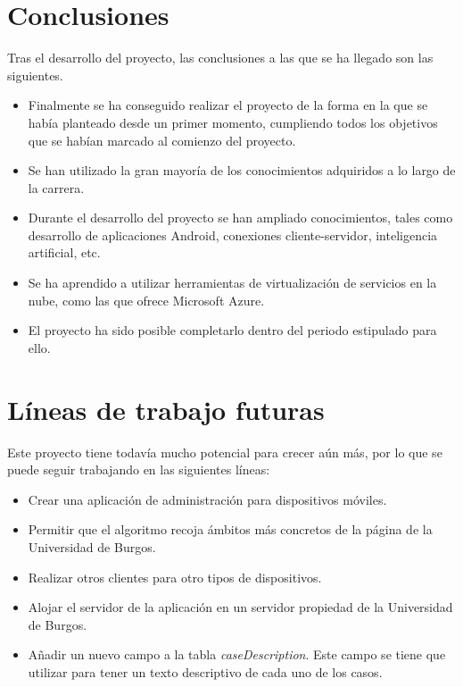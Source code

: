 
\section{Conclusiones}

Tras el desarrollo del proyecto, las conclusiones a las que se ha llegado son las siguientes.

\begin{itemize}
	\tightlist
	\item
	Finalmente se ha conseguido realizar el proyecto de la forma en la que se había planteado desde un primer momento, cumpliendo todos los objetivos que se habían marcado al comienzo del proyecto.	
	\item 
	Se han utilizado la gran mayoría de los conocimientos adquiridos a lo largo de la carrera.
	\item 
	Durante el desarrollo del proyecto se han ampliado conocimientos, tales como desarrollo de aplicaciones Android, conexiones cliente-servidor, inteligencia artificial, etc.
	\item 
	Se ha aprendido a utilizar herramientas de virtualización de servicios en la nube, como las que ofrece Microsoft Azure.
	\item 
	El proyecto ha sido posible completarlo dentro del periodo estipulado para ello.
\end{itemize}

\section{Líneas de trabajo futuras}

Este proyecto tiene todavía mucho potencial para crecer aún más, por lo que se puede seguir trabajando en las siguientes líneas:

\begin{itemize}
	\tightlist
	\item
	Crear una aplicación de administración para dispositivos móviles.
	\item 
	Permitir que el algoritmo recoja ámbitos más concretos de la página de la Universidad de Burgos.
	\item
	Realizar otros clientes para otro tipos de dispositivos.
	\item 
	Alojar el servidor de la aplicación en un servidor propiedad de la Universidad de Burgos.
	\item 
	Añadir un nuevo campo a la tabla \textit{caseDescription}. Este campo se tiene que utilizar para tener un texto descriptivo de cada uno de los casos.
\end{itemize}